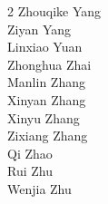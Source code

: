 \begin{multicols}{2}
\color{black}Zhouqike Yang\\
\color{black}Ziyan Yang\\
\color{black}Linxiao Yuan\\
\color{black}Zhonghua Zhai\\
\color{black}Manlin Zhang\\
\color{black}Xinyan Zhang\\
\color{black}Xinyu Zhang\\
\color{black}Zixiang Zhang\\
\color{black}Qi Zhao\\
\color{black}Rui Zhu\\
\color{black}Wenjia Zhu
\end{multicols} %







